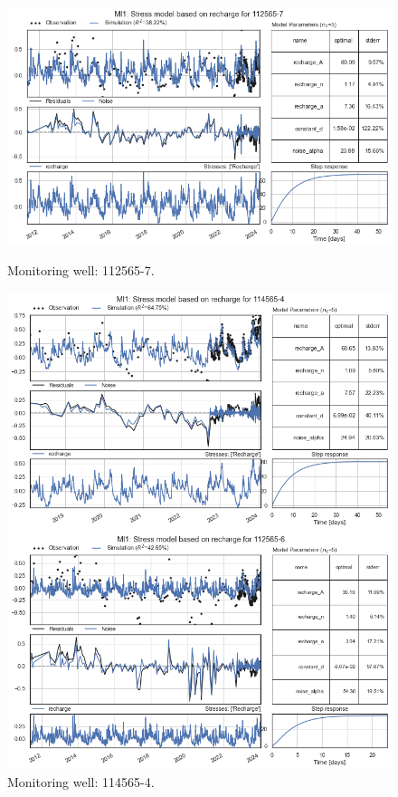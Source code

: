 \begin{figure}[htbp]
    \centering
    \begin{minipage}{0.32\textwidth}
        \centering
        \includegraphics[width=\linewidth]{frontmatter/Rozenburg-fig/22.png}
        \caption{Monitoring well: 112565-7.}
        \label{fig:112565-3}
    \end{minipage}
    \hfill
    \begin{minipage}{0.32\textwidth}
        \centering
        \includegraphics[width=\linewidth]{frontmatter/Rozenburg-fig/23.png}
        \caption{Monitoring well: 114565-4.}
        \label{fig:112565-3}
    \end{minipage}
    \hfill
    \begin{minipage}{0.32\textwidth}
        \centering
        \includegraphics[width=\linewidth]{frontmatter/Rozenburg-fig/24.png}

\end{minipage}
\end{figure}
